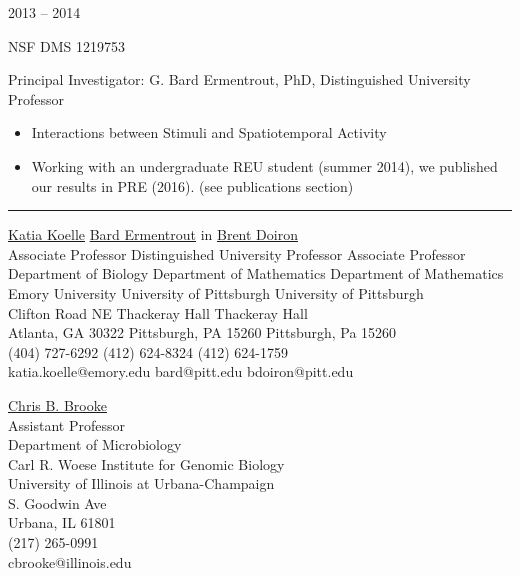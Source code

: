 \documentclass[a4paper,10pt]{article}
\newlength{\cvcolumngapwidth}
\newlength{\cvleftcolumnwidth}
\newlength{\cvrightcolumnwidth}
\newcommand{\cvsectionstyle}[1]{{\normalsize\cvsectionfont\textcolor{cvsectioncolor}{#1}}}
\newcommand{\cvtitlestyle}[1]{{\large\cvtitlefont\textcolor{cvtitlecolor}{#1}}}
\newcommand{\cvheadingstyle}[1]{{\normalsize\cvheadingfont\textcolor{cvheadingcolor}{#1}}}
\newlength{\cvafteritemskipamount}
\newlength{\cvaftersectionskipamount}
\newlength{\cvaftertitleskipamount}
\newlength{\cvparskip}
\newcommand{\cvsection}[1]{
    \begin{minipage}[t]{\cvleftcolumnwidth}
        \raggedleft\cvsectionstyle{#1}
    \end{minipage}%
    \hspace{\cvcolumngapwidth}%
    \begin{minipage}[t]{\cvrightcolumnwidth}
        \textcolor{cvrulecolor}{\rule{\cvrightcolumnwidth}{0.3mm}}
    \end{minipage}

    \vspace{\cvaftersectionskipamount}
}
\newcommand{\cvitem}[2]{
    \begin{minipage}[t]{\cvleftcolumnwidth}
        \raggedleft #1
    \end{minipage}%
    \hspace{\cvcolumngapwidth}%
    \begin{minipage}[t]{\cvrightcolumnwidth}
        \setlength{\parskip}{\cvparskip} #2
    \end{minipage}

    \vspace{\cvafteritemskipamount}
}
\newcommand{\cvtitle}[1]{
    \cvtitlestyle{#1}

    \vspace{\cvaftertitleskipamount}
    \vspace{-\cvparskip}
}
\begin{document}
\cvitem{
    \cvheadingstyle{2013 -- 2014}
}{
    \cvtitle{NSF DMS 1219753} 
    Principal Investigator: G. Bard Ermentrout, PhD, Distinguished University Professor
    \begin{itemize}
        \item Interactions between Stimuli and Spatiotemporal Activity
        \item Working with an undergraduate REU student (summer 2014), we published our results in PRE (2016). (see publications section) \\
    \end{itemize}
    
}


\cvsection{REFERENCES}

\begin{tabbing}
\hskip 1in \= \href{https://scholarblogs.emory.edu/koellelab/}{Katia Koelle}              \hskip 1in \= \href{https://www.pitt.edu/~phase/}{Bard Ermentrout}      in \= \href{http://www.math.pitt.edu/~bdoiron/}{Brent Doiron} \\    
\>  Associate Professor													\> Distinguished University Professor			\> Associate Professor\\
\> Department of Biology           											\> Department of Mathematics			        		\>  Department of Mathematics\\
\> Emory University	            												\> University of Pittsburgh 				        \> University of Pittsburgh \\
 Clifton Road NE                											\> 301 Thackeray Hall				                  Thackeray Hall    \\
\> Atlanta, GA 30322														\> Pittsburgh, PA  15260                     			\> Pittsburgh, Pa 15260  \\
\> (404) 727-6292														\> (412) 624-8324        			                 	\>  (412) 624-1759 \\   
\> katia.koelle@emory.edu												\> bard@pitt.edu                       	    				\> bdoiron@pitt.edu \\
\end{tabbing}

\begin{tabbing}
\hskip 1in \= \href{https://scholarblogs.emory.edu/koellelab/}{Chris B. Brooke} \\
\>  Assistant Professor \\
\> Department of Microbiology \\
\> Carl R. Woese Institute for Genomic Biology \\
\> University of Illinois at Urbana-Champaign \\	      
 S. Goodwin Ave \\
\> Urbana, IL 61801 \\
\> (217) 265-0991 \\
\> cbrooke@illinois.edu \\
\end{tabbing}
\end{document}
